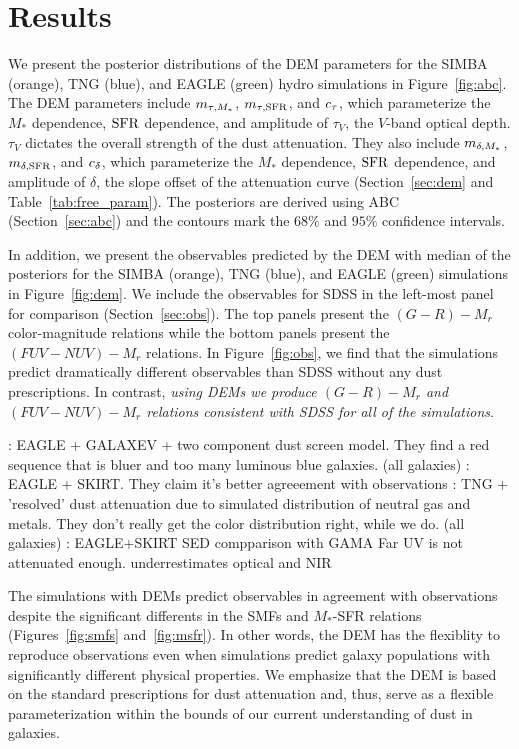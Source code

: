 \section{Results} \label{sec:results}
We present the posterior distributions of the DEM parameters for the SIMBA
(orange), TNG (blue), and EAGLE (green) hydro simulations in
Figure~\ref{fig:abc}. The DEM parameters include $m_{\tau,M_*}$, $m_{\tau,{\rm SFR}}$, and
$c_\tau$, which parameterize the $M_*$ dependence, ${\rm SFR}$ dependence, and 
amplitude of $\tau_V$, the $V$-band optical depth. $\tau_V$ dictates the
overall strength of the dust attenuation. They also include $m_{\delta,M_*}$,
$m_{\delta,{\rm SFR}}$, and $c_\delta$, which parameterize the $M_*$ dependence, ${\rm SFR}$ dependence,
and amplitude of $\delta$, the slope offset of the attenuation curve
(Section~\ref{sec:dem} and Table~\ref{tab:free_param}). The posteriors 
are derived using ABC (Section~\ref{sec:abc}) and the contours mark the 
$68\%$ and $95\%$ confidence intervals. 

In addition, we present the observables predicted by the DEM with median of the
posteriors for the SIMBA (orange), TNG (blue), and EAGLE (green) simulations 
in Figure~\ref{fig:dem}. We include the observables for SDSS in the left-most 
panel for comparison (Section~\ref{sec:obs}). The top panels present the $(G-R) - M_r$ 
color-magnitude relations while the bottom panels present the $(FUV-NUV) - M_r$
relations. In Figure~\ref{fig:obs}, we find that the simulations predict
dramatically different observables than SDSS without any dust prescriptions. 
In contrast, {\em using DEMs we produce $(G-R) - M_r$ and $(FUV-NUV) - M_r$ 
relations consistent with SDSS for all of the simulations}. 

\cite{trayford2015}: EAGLE + GALAXEV + two component dust screen model. 
They find a red sequence that is bluer and too many luminous blue galaxies.
(all galaxies)
\cite{trayford2017}: EAGLE + SKIRT. They claim it's better agreeement with
observations
\cite{nelson2018}: TNG + 'resolved' dust attenuation due to simulated
distribution of neutral gas and metals. They don't really get the color
distribution right, while we do. 
(all galaxies)
\cite{baes2019}: EAGLE+SKIRT SED compparison with GAMA 
Far UV is not attenuated enough. underrestimates optical and NIR

The simulations with DEMs predict observables in agreement with observations 
despite the significant differents in the SMFs and $M_*$-SFR relations 
(Figures~\ref{fig:smfs} and~\ref{fig:msfr}). In other words, the DEM has the 
flexiblity to reproduce observations even when simulations predict galaxy
populations with significantly different physical properties. We emphasize that
the DEM is based on the standard prescriptions for dust attenuation and, thus,
serve as a flexible parameterization within the bounds of our current
understanding of dust in galaxies.

